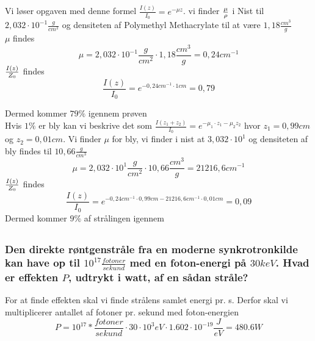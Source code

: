 \documentclass[a4paper,twoside]{article}
\begin{document}
\subsection{}
Vi løser opgaven med denne formel $\frac{I(z)}{I_0}=e^{-\mu z}$. vi finder $\mu\over\rho$ i Nist til $2,032\cdot 10^{-1} \frac{g}{cm^2}$ og densiteten af Polymethyl Methacrylate til at være $1,18\frac{cm^3}{g}$\\
$\mu$ findes
\begin{equation*}
    \mu=2,032\cdot10^{-1}\frac{g}{cm^2}\cdot1,18\frac{cm^3}{g}=0,24cm^{-1}
\end{equation*}
$I(z)\over Z_0$ findes
\begin{equation*}
    \frac{I(z)}{I_0}=e^{-0,24cm^{-1}\cdot 1cm}=0,79
\end{equation*}
 
    Dermed kommer $79\%$ igennem prøven\\
Hvis $1\%$ er bly kan vi beskrive det som $\frac{I(z_1+z_2)}{I_0}=e^{-\mu_1\cdot z_1-\mu_2 z_2}$ hvor $z_1=0,99cm$ og $z_2=0,01cm$. Vi finder $\mu$ for bly, vi finder i nist at $3,032\cdot10^1$ og densiteten af bly findes til $10,66\frac{g}{cm^3}$
\begin{equation*}
    \mu=2,032\cdot10^{1}\frac{g}{cm^2}\cdot10,66\frac{cm^3}{g}=21216,6cm^{-1}
\end{equation*}
$I(z)\over Z_0$ findes
\begin{equation*}
    \frac{I(z)}{I_0}=e^{-0,24cm^{-1}\cdot 0,99cm - 21216,6cm^{-1}\cdot 0,01cm}=0,09
\end{equation*}
Dermed kommer $9\%$ af strålingen igennem




\subsection{}
\subsubsection*{Den direkte røntgenstråle fra en moderne synkrotronkilde kan have op til $10^{17} \frac{fotoner}{sekund}$ med en foton-energi på $30keV$. Hvad er effekten $P$, udtrykt i watt, af en sådan stråle?}
For at finde effekten skal vi finde strålens samlet energi pr. s. Derfor skal vi multiplicerer antallet af fotoner pr. sekund med foton-energien 
\begin{equation*}
P=10^{17}*\frac{fotoner}{sekund}\cdot30\cdot10^{3}eV\cdot1.602\cdot10^{-19} \frac{J}{eV}=480.6W
\end{equation*}
    
\end{document}
